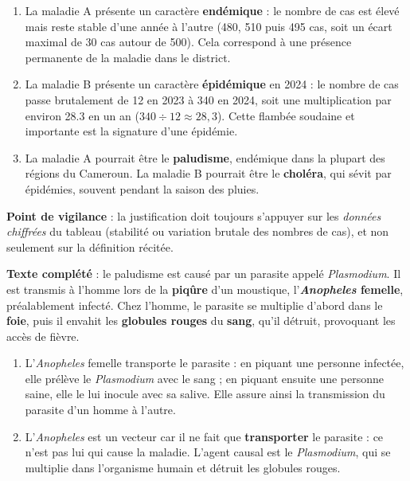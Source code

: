 \documentclass[11pt]{article}
\newcommand{\cle}[1]{{\popxbold\color{popdark}#1}}
\begin{document}
\begin{corrige}
\begin{enumerate}
\item La maladie A présente un caractère \textbf{endémique} : le nombre de cas est élevé mais reste stable d'une année à l'autre (480, 510 puis 495 cas, soit un écart maximal de 30 cas autour de 500). Cela correspond à une présence permanente de la maladie dans le district.
\item La maladie B présente un caractère \textbf{épidémique} en 2024 : le nombre de cas passe brutalement de 12 en 2023 à 340 en 2024, soit une multiplication par environ \num{28,3} en un an ($340 \div 12 \approx 28,3$). Cette flambée soudaine et importante est la signature d'une épidémie.
\item La maladie A pourrait être le \textbf{paludisme}, endémique dans la plupart des régions du Cameroun. La maladie B pourrait être le \textbf{choléra}, qui sévit par épidémies, souvent pendant la saison des pluies.
\end{enumerate}
\textbf{Point de vigilance} : la justification doit toujours s'appuyer sur les \emph{données chiffrées} du tableau (stabilité ou variation brutale des nombres de cas), et non seulement sur la définition récitée.
\end{corrige}

\begin{corrige}
\textbf{Texte complété} : le paludisme est causé par un parasite appelé \emph{Plasmodium}. Il est transmis à l'homme lors de la \textbf{piqûre} d'un moustique, l'\textbf{\emph{Anopheles} femelle}, préalablement infecté. Chez l'homme, le parasite se multiplie d'abord dans le \textbf{foie}, puis il envahit les \textbf{globules rouges} du \textbf{sang}, qu'il détruit, provoquant les accès de fièvre.
\begin{enumerate}
\item L'\emph{Anopheles} femelle transporte le parasite : en piquant une personne infectée, elle prélève le \emph{Plasmodium} avec le sang ; en piquant ensuite une personne saine, elle le lui inocule avec sa salive. Elle assure ainsi la transmission du parasite d'un homme à l'autre.
\item L'\emph{Anopheles} est un \cle{vecteur} car il ne fait que \textbf{transporter} le parasite : ce n'est pas lui qui cause la maladie. L'agent causal est le \emph{Plasmodium}, qui se multiplie dans l'organisme humain et détruit les globules rouges.
\end{enumerate}
\end{corrige}
\end{document}
